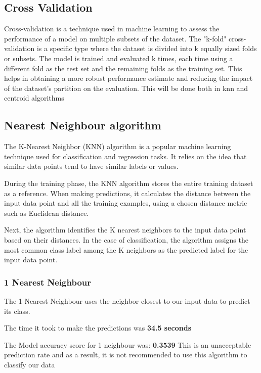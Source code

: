 \documentclass{article}
\begin{document}
\subsection{Cross Validation}
Cross-validation is a technique used in machine learning to assess the performance of a model on multiple subsets of the dataset. The "k-fold" cross-validation is a specific type where the dataset is divided into k equally sized folds or subsets. The model is trained and evaluated k times, each time using a different fold as the test set and the remaining folds as the training set. This helps in obtaining a more robust performance estimate and reducing the impact of the dataset's partition on the evaluation. This will be done both in knn and centroid algorithms

\subsection{Nearest Neighbour algorithm}

The K-Nearest Neighbor (KNN) algorithm is a popular machine learning technique used for classification and regression tasks. It relies on the idea that similar data points tend to have similar labels or values.

During the training phase, the KNN algorithm stores the entire training dataset as a reference. When making predictions, it calculates the distance between the input data point and all the training examples, using a chosen distance metric such as Euclidean distance.

Next, the algorithm identifies the K nearest neighbors to the input data point based on their distances. In the case of classification, the algorithm assigns the most common class label among the K neighbors as the predicted label for the input data point.

\subsubsection{1 Nearest Neighbour}

The 1 Nearest Neighbour uses the neighbor closest to our input data to predict its class. 

The time it took to make the predictions was \textbf{34.5 seconds}

The Model accuracy score for 1 neighbour was: \textbf{0.3539}
This is an unacceptable prediction rate and as a result, it is not recommended to use this algorithm to classify our data 
\end{document}
